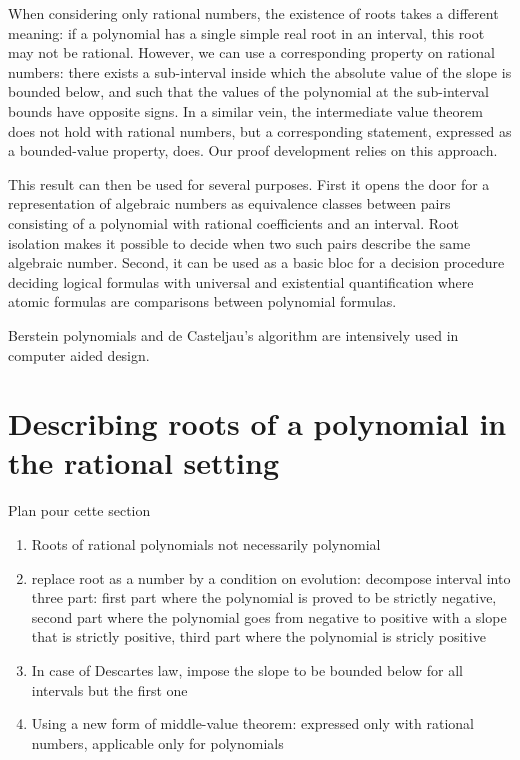 \documentclass{mscs}
\begin{document}
When considering only rational numbers, the existence of roots takes a
different meaning: if a polynomial has a single simple real root in an
interval, this root may not be rational.  However, we can use a
corresponding property on rational numbers: there exists a
sub-interval inside which the absolute value of the slope is bounded
below, and such that the values of the polynomial at the sub-interval
bounds have opposite signs.  In a similar vein, the intermediate value
theorem does not hold with rational numbers, but a corresponding
statement, expressed as a bounded-value property, does.  Our proof
development relies on this approach.

This result can then be used for several purposes.  First it opens the
door for a representation of algebraic numbers as equivalence classes
between pairs consisting of a polynomial with rational coefficients
and an interval.  Root isolation makes it possible to decide when two
such pairs describe the same algebraic number.  Second, it can be used
as a basic bloc for a decision procedure deciding logical formulas
with universal and existential quantification where atomic formulas
are comparisons between polynomial formulas.

Berstein polynomials and de Casteljau's algorithm are intensively used
in computer aided design.

\section{Describing roots of a polynomial in the rational setting}
Plan pour cette section
\begin{enumerate}
\item Roots of rational polynomials not necessarily polynomial
\item replace root as a number by a condition on evolution: decompose interval into three part: first part where the polynomial is proved to be strictly negative, second part where the polynomial goes from negative to positive with a slope that is strictly positive, third part where the polynomial is stricly positive
\item In case of Descartes law, impose the slope to be bounded below for all intervals but the first one
\item Using a new form of middle-value theorem: expressed only with rational numbers, applicable only for polynomials
\end{enumerate}
\end{document}
